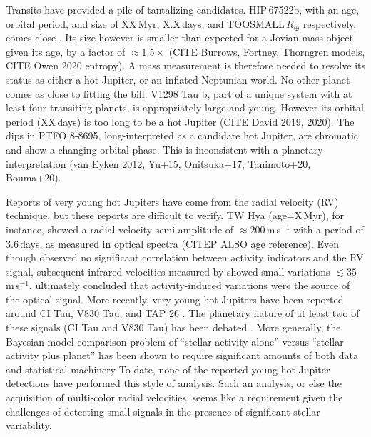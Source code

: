\documentclass[12pt,twocolumn,tighten]{aastex63}
\begin{document}
Transits have provided a pile of tantalizing candidates.  HIP\,67522b,
with an age, orbital period, and size of XX\,Myr, X.X\,days, and
TOOSMALL\,$R_\oplus$ respectively, comes close
\citep{rizzuto_tess_2020}.  Its
size however is smaller than expected for a Jovian-mass object given
its age, by a factor of $\approx1.5\times$ (CITE Burrows, Fortney,
Thorngren models, CITE Owen 2020 entropy).  A mass measurement is
therefore needed to resolve its status as either a hot Jupiter, or an
inflated Neptunian world.  No other planet comes as close to fitting
the bill.  V1298 Tau b, part of a unique system with at least four
transiting planets, is appropriately large and young. However its orbital
period (XX\,days) is too long to be a hot Jupiter (CITE David 2019,
2020).  The dips in PTFO 8-8695, long-interpreted as a candidate hot
Jupiter, are chromatic and show a changing orbital phase.  This is
inconsistent with a planetary interpretation (van Eyken 2012, Yu+15,
Onitsuka+17, Tanimoto+20, Bouma+20).

Reports of very young hot Jupiters have come from the radial velocity
(RV) technique, but these reports are difficult to verify.  TW Hya
(age=X\,Myr), for instance, showed a radial velocity semi-amplitude of
$\approx$200\,m\,s$^{-1}$ with a period of 3.6\,days, as measured in
optical spectra \citep{setiawan_young_2008} (CITEP ALSO age reference).
Even though \citet{setiawan_young_2008} observed no significant
correlation between activity indicators and the RV signal, subsequent
infrared velocities measured by \citet{huelamo_tw_2008} showed small
variations $\lesssim 35\,$m\,s$^{-1}$.  \citet{huelamo_tw_2008}
ultimately concluded that activity-induced variations were the source
of the optical signal.  More recently, very young hot Jupiters have
been reported around CI Tau, V830 Tau, and TAP 26
\citep{johns-krull_CI_Tau_candidate_2016,donati_hot_2016,donati_hot_2017,yu_hot_2017,biddle_k2_2018,flagg_co_2019}.
The planetary nature of at least two of these signals (CI Tau and V830
Tau) has been debated \citep{donati_magnetic_2020,damasso_gaps_2020}.
More generally, the Bayesian model comparison problem of ``stellar
activity alone'' versus ``stellar activity plus planet'' has been
shown to require significant amounts of both data and statistical
machinery \citep[{\it
e.g.},][]{barragan_radial_2019,klein_simulated_2020} To date, none of
the reported young hot Jupiter detections have performed this style of
analysis.  Such an analysis, or else the acquisition of multi-color
radial velocities, seems like a requirement given the challenges of
detecting small signals in the presence of significant stellar
variability.
\end{document}
